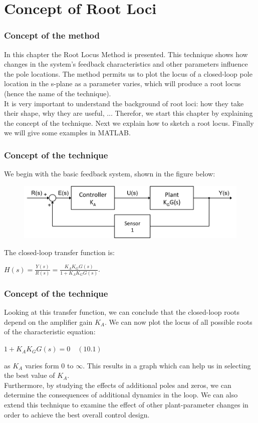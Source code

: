 \section{Concept of Root Loci}

\begin{frame}
\frametitle{Concept of the method}
In this chapter the Root Locus Method is presented. This technique shows how changes in the system's feedback characteristics and other parameters influence the pole locations. The method permits us to plot the locus of a closed-loop pole location in the s-plane as a parameter varies, which will produce a root locus (hence the name of the technique).\\
\vspace{1em}
It is very important to understand the background of root loci: how they take their shape, why they are useful, ... Therefor, we start this chapter by explaining the concept of the technique. Next we explain how to sketch a root locus. Finally we will give some examples in MATLAB.
\end{frame}

\begin{frame}
\frametitle{Concept of the technique}
	We begin with the basic feedback system, shown in the figure below:
	\begin{figure}
		\centering
		\includegraphics[width=1\linewidth]{closed_loop_diagram}
	\end{figure}
	The closed-loop transfer function is:
	\begin{center}
		$H(s) = \frac{Y(s)}{R(s)} = \frac{K_AK_GG(s)}{1 + K_AK_GG(s)}$.
	\end{center}
\end{frame}

\begin{frame}
\frametitle{Concept of the technique}
	Looking at this transfer function, we can conclude that the closed-loop roots depend on the amplifier gain $K_A$. We can now plot the locus of all possible roots of the characteristic equation: 
	\begin{center}
		$1 + K_AK_GG(s) = 0 \hspace{1em} (10.1)$
	\end{center}
	as $K_A$ varies form $0$ to $\infty$. This results in a graph which can help us in selecting the best value of $K_A$.\\
	\vspace{1em}
	Furthermore, by studying the effects of additional poles and zeros, we can determine the consequences of additional dynamics in the loop. We can also extend this technique to examine the effect of other plant-parameter changes in order to achieve the best overall control design.
\end{frame}

